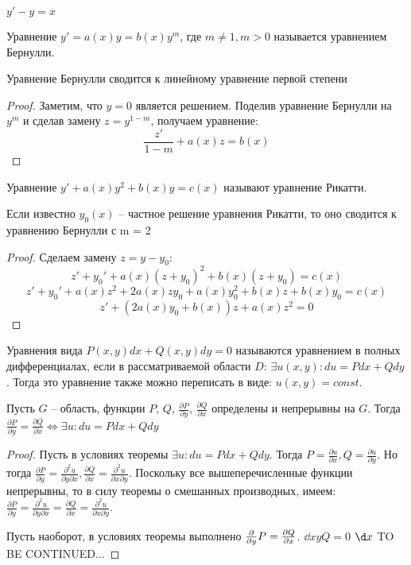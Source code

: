 \documentclass[document.tex]{subfiles}
\begin{document}
\begin{example}
$y' - y = x$
\end{example}
\begin{definition}
Уравнение $y' = a(x)y = b(x)y^m$, где $m \neq 1, m > 0$ называется уравнением Бернулли.
\end{definition}
\begin{statement}
Уравнение Бернулли сводится к линейному уравнение первой степени
\end{statement}
\begin{proof}
Заметим, что $y = 0$ является решением. Поделив уравнение Бернулли на $y^m$ и сделав замену $z = y^{1-m}$, получаем уравнение:
$$\frac{z'}{1-m} + a(x)z = b(x)$$
\end{proof}
\begin{definition}
Уравнение $y' + a(x)y^2 + b(x)y = c(x)$ называют уравнение Рикатти.
\end{definition}
\begin{statement}
Если известно $y_0(x)$ -- частное решение уравнения Рикатти, то оно сводится к уравнению Бернулли с m = 2
\end{statement}
\begin{proof}
Сделаем замену $z = y - y_0$:
$$z' + y_0' + a(x)(z+y_0)^2 + b(x)(z+y_0) = c(x)$$
$$z' + y_0' + a(x)z^2 + 2a(x)zy_0 + a(x)y_0^2 + b(x)z + b(x)y_0 = c(x)$$
$$z' + (2a(x)y_0 + b(x))z + a(x)z^2 = 0$$
\end{proof}
\begin{definition}
Уравнения вида $P(x, y)dx + Q(x, y)dy = 0$ называются уравнением в полных дифференциалах, если в рассматриваемой области $D$: $\exists u(x, y): du = Pdx + Qdy$. Тогда это уравнение также можно переписать в виде: $u(x, y) = const$.
\end{definition}
\begin{theorem}
Пусть $G$ -- область, функции $P$, $Q$, $\frac{\partial P}{\partial y}$, $\frac{\partial Q}{\partial x}$ определены и непрерывны на $G$. Тогда $\frac{\partial P}{\partial y} = \frac{\partial Q}{\partial x} \Leftrightarrow \exists u : du = Pdx + Qdy$
\end{theorem}
\begin{proof}
Пусть в условиях теоремы $\exists u : du = Pdx+Qdy$. Тогда $P = \frac{\partial u}{\partial x},
Q = \frac{\partial u}{\partial y}$. Но тогда $\frac{\partial P}{\partial y} = \frac{\partial^2 u}{\partial y \partial x}, \frac{\partial Q}{\partial x} = \frac{\partial ^2 u}{\partial x \partial y}$. Поскольку все вышеперечисленные функции непрерывны, то в силу теоремы о смешанных производных, имеем: $\frac{\partial P}{\partial y} = \frac{\partial^2 u}{\partial y \partial x} = \frac{\partial Q}{\partial x} = \frac{\partial ^2 u}{\partial x \partial y}$.

Пусть наоборот, в условиях теоремы выполнено $\frac{\partial}{\partial y}P = \frac{\partial Q}{\partial x}$.
$\dd{x}{y}Q = 0$
$\d x$
TO BE CONTINUED...
\end{proof}
\end{document}
